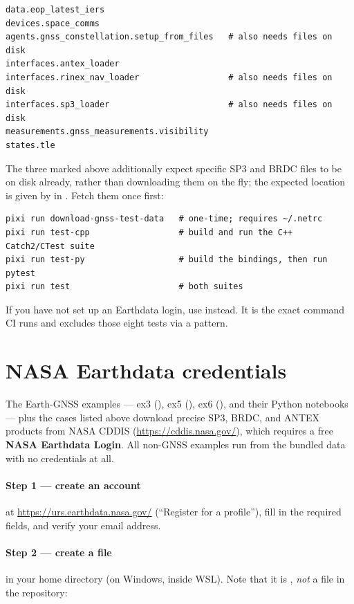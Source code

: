 \begin{lstlisting}[language=shell]
data.eop_latest_iers
devices.space_comms
agents.gnss_constellation.setup_from_files   # also needs files on disk
interfaces.antex_loader
interfaces.rinex_nav_loader                  # also needs files on disk
interfaces.sp3_loader                        # also needs files on disk
measurements.gnss_measurements.visibility
states.tle
\end{lstlisting}

The three marked above additionally expect specific SP3 and BRDC files to be on
disk already, rather than downloading them on the fly; the expected location is
given by  in
. Fetch them once first:

\begin{lstlisting}[language=shell]
pixi run download-gnss-test-data   # one-time; requires ~/.netrc
pixi run test-cpp                  # build and run the C++ Catch2/CTest suite
pixi run test-py                   # build the bindings, then run pytest
pixi run test                      # both suites
\end{lstlisting}

If you have not set up an Earthdata login, use 
instead. It is the exact command CI runs and excludes those eight tests via a
 pattern.

\section{NASA Earthdata credentials}
\label{sec:gs-earthdata}

The Earth-GNSS examples --- ex3 (), ex5
(), ex6 (), and their Python
notebooks --- plus the  cases listed above download
precise SP3, BRDC, and ANTEX products from NASA CDDIS
(\url{https://cddis.nasa.gov/}), which requires a free \textbf{NASA Earthdata
Login}. All non-GNSS examples run from the bundled data with no credentials at
all.

\paragraph{Step 1 --- create an account}
at \url{https://urs.earthdata.nasa.gov/} (``Register for a profile''), fill in
the required fields, and verify your email address.

\paragraph{Step 2 --- create a  file}
in your home directory (on Windows, inside WSL). Note that it is
, \emph{not} a file in the repository:

